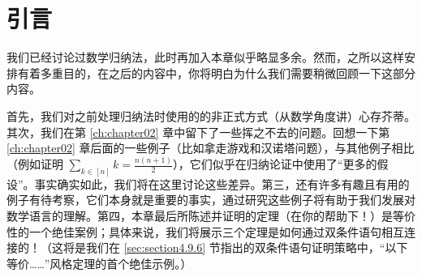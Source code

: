 \section{引言}

我们已经讨论过数学归纳法，此时再加入本章似乎略显多余。然而，之所以这样安排有着多重目的，在之后的内容中，你将明白为什么我们需要稍微回顾一下这部分内容。

首先，我们对之前处理归纳法时使用的的非正式方式（从数学角度讲）心存芥蒂。其次，我们在第 \ref{ch:chapter02} 章中留下了一些挥之不去的问题。回想一下第 \ref{ch:chapter02} 章后面的一些例子（比如拿走游戏和汉诺塔问题），与其他例子相比（例如证明 $\sum_{k \in [n]} k=\frac{n(n+1)}{2}$），它们似乎在归纳论证中使用了``更多的假设''。事实确实如此，我们将在这里讨论这些差异。第三，还有许多有趣且有用的例子有待考察，它们本身就是重要的事实，通过研究这些例子将有助于我们发展对数学语言的理解。第四，本章最后所陈述并证明的定理（在你的帮助下！）是等价性的一个绝佳案例；具体来说，我们将展示三个定理是如何通过双条件语句相互连接的！（这将是我们在 \ref{sec:section4.9.6} 节指出的双条件语句证明策略中，``以下等价……''风格定理的首个绝佳示例。）

